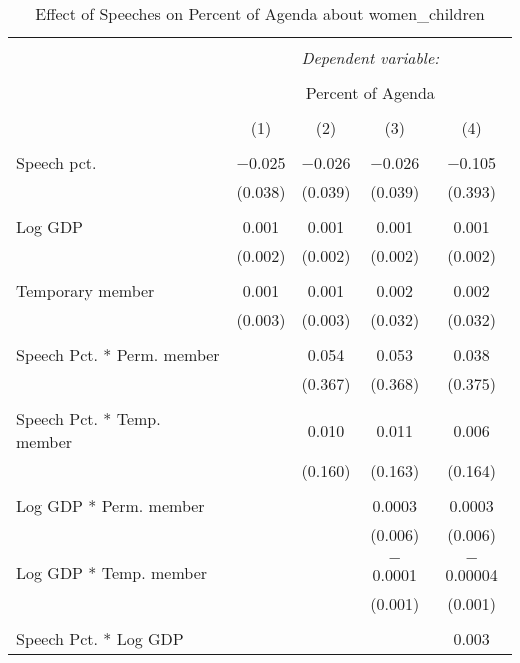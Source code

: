 
\begin{table}[!htbp] \centering 
  \caption{Effect of Speeches on Percent of Agenda about  women_children} 
  \label{} 
\begin{tabular}{@{\extracolsep{5pt}}lcccc} 
\\[-1.8ex]\hline 
\hline \\[-1.8ex] 
 & \multicolumn{4}{c}{\textit{Dependent variable:}} \\ 
\cline{2-5} 
\\[-1.8ex] & \multicolumn{4}{c}{Percent of Agenda} \\ 
\\[-1.8ex] & (1) & (2) & (3) & (4)\\ 
\hline \\[-1.8ex] 
 Speech pct. & $-$0.025 & $-$0.026 & $-$0.026 & $-$0.105 \\ 
  & (0.038) & (0.039) & (0.039) & (0.393) \\ 
  & & & & \\ 
 Log GDP & 0.001 & 0.001 & 0.001 & 0.001 \\ 
  & (0.002) & (0.002) & (0.002) & (0.002) \\ 
  & & & & \\ 
 Temporary member & 0.001 & 0.001 & 0.002 & 0.002 \\ 
  & (0.003) & (0.003) & (0.032) & (0.032) \\ 
  & & & & \\ 
 Speech Pct. * Perm. member &  & 0.054 & 0.053 & 0.038 \\ 
  &  & (0.367) & (0.368) & (0.375) \\ 
  & & & & \\ 
 Speech Pct. * Temp. member &  & 0.010 & 0.011 & 0.006 \\ 
  &  & (0.160) & (0.163) & (0.164) \\ 
  & & & & \\ 
 Log GDP * Perm. member &  &  & 0.0003 & 0.0003 \\ 
  &  &  & (0.006) & (0.006) \\ 
  & & & & \\ 
 Log GDP * Temp. member &  &  & $-$0.0001 & $-$0.00004 \\ 
  &  &  & (0.001) & (0.001) \\ 
  & & & & \\ 
 Speech Pct. * Log GDP &  &  &  & 0.003 \\ 

\end{tabular}
\end{table}
